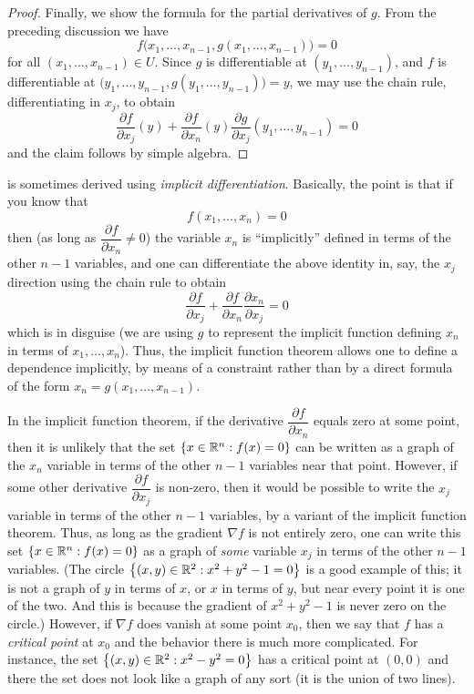 \begin{proof}
  Finally, we show the formula for the partial derivatives of \(g\).
  From the preceding discussion we have
  \[
    f\big(x_1, \dots, x_{n - 1}, g(x_1, \dots, x_{n - 1})\big) = 0
  \]
  for all \((x_1, \dots, x_{n - 1}) \in U\).
  Since \(g\) is differentiable at \((y_1, \dots, y_{n - 1})\), and \(f\) is differentiable at \(\big(y_1, \dots, y_{n - 1}, g(y_1, \dots, y_{n - 1})\big) = y\), we may use the chain rule, differentiating in \(x_j\), to obtain
  \[
    \dfrac{\partial f}{\partial x_j}(y) + \dfrac{\partial f}{\partial x_n}(y) \dfrac{\partial g}{\partial x_j}(y_1, \dots, y_{n - 1}) = 0
  \]
  and the claim follows by simple algebra.
\end{proof}

\begin{rmk}\label{ii:6.8.2}
   is sometimes derived using \emph{implicit differentiation}.
  Basically, the point is that if you know that
  \[
    f(x_1, \dots, x_n) = 0
  \]
  then (as long as \(\dfrac{\partial f}{\partial x_n} \neq 0\)) the variable \(x_n\) is ``implicitly'' defined in terms of the other \(n - 1\) variables, and one can differentiate the above identity in, say, the \(x_j\) direction using the chain rule to obtain
  \[
    \dfrac{\partial f}{\partial x_j} + \dfrac{\partial f}{\partial x_n} \dfrac{\partial x_n}{\partial x_j} = 0
  \]
  which is  in disguise
  (we are using \(g\) to represent the implicit function defining \(x_n\) in terms of \(x_1, \dots, x_n\)).
  Thus, the implicit function theorem allows one to define a dependence implicitly, by means of a constraint rather than by a direct formula of the form \(x_n = g(x_1, \dots, x_{n - 1})\).
\end{rmk}

\begin{note}
  In the implicit function theorem, if the derivative \(\dfrac{\partial f}{\partial x_n}\) equals zero at some point, then it is unlikely that the set \(\left\lbrace x \in \mathbb{R}^n : f(x) = 0\right\rbrace\) can be written as a graph of the \(x_n\) variable in terms of the other \(n - 1\) variables near that point.
  However, if some other derivative \(\dfrac{\partial f}{\partial x_j}\) is non-zero, then it would be possible to write the \(x_j\) variable in terms of the other \(n - 1\) variables, by a variant of the implicit function theorem.
  Thus, as long as the gradient \(\nabla f\) is not entirely zero, one can write this set \(\left\lbrace x \in \mathbb{R}^n : f(x) = 0\right\rbrace\) as a graph of \emph{some} variable \(x_j\) in terms of the other \(n - 1\) variables.
  (The circle \(\left\lbrace(x, y) \in \mathbb{R}^2 : x^2 + y^2 - 1 = 0\right\rbrace\) is a good example of this;
  it is not a graph of \(y\) in terms of \(x\), or \(x\) in terms of \(y\), but near every point it is one of the two.
  And this is because the gradient of \(x^2 + y^2 - 1\) is never zero on the circle.)
  However, if \(\nabla f\) does vanish at some point \(x_0\), then we say that \(f\) has a \emph{critical point} at \(x_0\) and the behavior there is much more complicated.
  For instance, the set \(\left\lbrace(x, y) \in \mathbb{R}^2 : x^2 - y^2 = 0\right\rbrace\) has a critical point at \((0, 0)\) and there the set does not look like a graph of any sort
  (it is the union of two lines).
\end{note}

